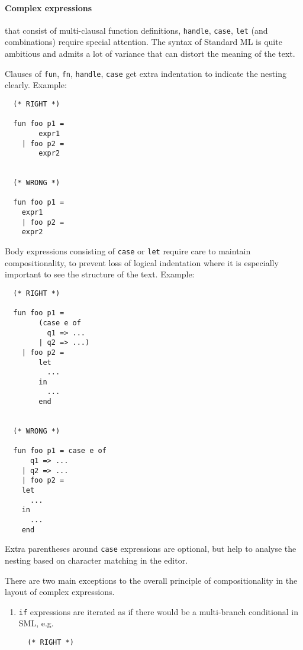\begin{isabellebody}
\begin{isamarkuptext}
  \paragraph{Complex expressions} that consist of multi-clausal
  function definitions, \verb|handle|, \verb|case|,
  \verb|let| (and combinations) require special attention.  The
  syntax of Standard ML is quite ambitious and admits a lot of
  variance that can distort the meaning of the text.

  Clauses of \verb|fun|, \verb|fn|, \verb|handle|,
  \verb|case| get extra indentation to indicate the nesting
  clearly.  Example:

  \begin{verbatim}
  (* RIGHT *)

  fun foo p1 =
        expr1
    | foo p2 =
        expr2


  (* WRONG *)

  fun foo p1 =
    expr1
    | foo p2 =
    expr2
  \end{verbatim}

  Body expressions consisting of \verb|case| or \verb|let|
  require care to maintain compositionality, to prevent loss of
  logical indentation where it is especially important to see the
  structure of the text.  Example:

  \begin{verbatim}
  (* RIGHT *)

  fun foo p1 =
        (case e of
          q1 => ...
        | q2 => ...)
    | foo p2 =
        let
          ...
        in
          ...
        end


  (* WRONG *)

  fun foo p1 = case e of
      q1 => ...
    | q2 => ...
    | foo p2 =
    let
      ...
    in
      ...
    end
  \end{verbatim}

  Extra parentheses around \verb|case| expressions are optional,
  but help to analyse the nesting based on character matching in the
  editor.

  \medskip There are two main exceptions to the overall principle of
  compositionality in the layout of complex expressions.

  \begin{enumerate}

  \item \verb|if| expressions are iterated as if there would be
  a multi-branch conditional in SML, e.g.

  \begin{verbatim}
  (* RIGHT *)


\end{verbatim}
\end{enumerate}
\end{isamarkuptext}
\end{isabellebody}
